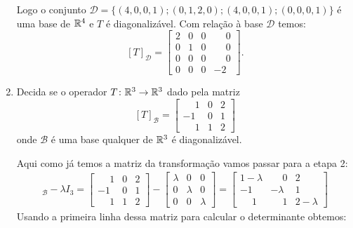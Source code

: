 \begin{exemplo}
\begin{enumerate}[label={\arabic*})]
\begin{solucao}
                Logo o conjunto $\mathcal{D} = \{(4, 0, 0, 1); (0, 1, 2, 0); (4, 0, 0, 1); (0, 0, 0, 1)\}$ é uma base de $\mathbb{R}^4$ e $T$ é diagonalizável. Com rela\c{c}ão à base $\mathcal{D}$ temos:
                \[
                    [T]_\mathcal{D} = \begin{bmatrix}2 & 0 & 0 & \phantom{-}0\\0 & 1 & 0 & \phantom{-}0\\0 & 0 & 0 & \phantom{-}0\\0 & 0 & 0 & -2\end{bmatrix}.
                \]
            \end{solucao}

        \item Decida se o operador $T \colon \mathbb{R}^3 \to \mathbb{R}^3$ dado pela matriz
            \[
                [T]_\mathcal{B} = \begin{bmatrix}\phantom{-}1 & 0 & 2\\-1 & 0 & 1\\\phantom{-}1 & 1 & 2\end{bmatrix}
            \]
            onde $\mathcal{B}$ é uma base qualquer de $\mathbb{R}^3$ é diagonalizável.
            \begin{solucao}
                Aqui como já temos a matriz da transforma\c{c}ão vamos passar para a etapa 2:
                \begin{align*}
                    [T]_\mathcal{B} - \lambda I_3 = \begin{bmatrix}\phantom{-}1 & 0 & 2\\-1 & 0 & 1\\\phantom{-}1 & 1 & 2\end{bmatrix} - \begin{bmatrix} \lambda & 0 & 0\\0 & \lambda & 0\\0 & 0 & \lambda\end{bmatrix} = \begin{bmatrix}1 - \lambda & \phantom{-}0 & 2\\-1 & -\lambda & 1\\\phantom{-}1 & \phantom{-}1 &2 - \lambda\end{bmatrix}
                \end{align*}
                Usando a primeira linha dessa matriz para calcular o determinante obtemos:
                \begin{align*}

\end{align*}
\end{solucao}
\end{enumerate}
\end{exemplo}
